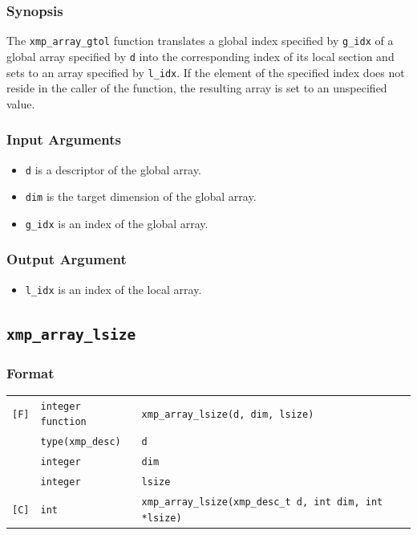 \subsubsection*{Synopsis}

The {\tt xmp\_array\_gtol} function translates a global index specified by {\tt g\_idx} of a global array specified by {\tt d} into the corresponding index of its local section and sets to an array specified by {\tt l\_idx}. 
If the element of the specified index does not reside in the caller of the function, 
the resulting array is set to an unspecified value.

\subsubsection*{Input Arguments}

\begin{itemize}
 \item {\tt d} is a descriptor of the global array.
 \item {\tt dim} is the target dimension of the global array.
 \item {\tt g\_idx} is an index of the global array.
\end{itemize}

\subsubsection*{Output Argument}

\begin{itemize}
 \item {\tt l\_idx} is an index of the local array.
\end{itemize}

\subsection{\tt xmp\_array\_lsize}\label{subsec:xmparraylsize}

\subsubsection*{Format}

\begin{tabular}{lll}

\verb![F]!& {\tt integer function}& {\tt xmp\_array\_lsize(d, dim, lsize)}\\
          & {\tt type(xmp\_desc)} & {\tt d}\\
          & {\tt integer} & {\tt dim}\\
          & {\tt integer} & {\tt lsize}\\

\verb![C]!&  {\tt int}& {\tt xmp\_array\_lsize(xmp\_desc\_t d, int dim, int *lsize)}\\

\end{tabular}

